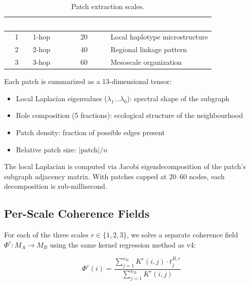 \documentclass{../yalumba}
\begin{document}
\begin{table}[H]
  \centering
  \tablestyle
  \caption{Patch extraction scales.}
  \label{tab:scales}
  \begin{tabular}{clcl}
    \toprule
    \rowcolor{table-header}
    \textcolor{white}{\textbf{Scale}} &
    \textcolor{white}{\textbf{Radius}} &
    \textcolor{white}{\textbf{Max nodes}} &
    \textcolor{white}{\textbf{Biological meaning}} \\
    \midrule
    1 & 1-hop & 20 & Local haplotype microstructure \\
    2 & 2-hop & 40 & Regional linkage pattern \\
    3 & 3-hop & 60 & Mesoscale organization \\
    \bottomrule
  \end{tabular}
\end{table}

Each patch is summarized as a 13-dimensional tensor:

\begin{itemize}
  \item Local Laplacian eigenvalues ($\lambda_1 \ldots \lambda_6$): spectral
    shape of the subgraph
  \item Role composition (5 fractions): ecological structure of the
    neighbourhood
  \item Patch density: fraction of possible edges present
  \item Relative patch size: $|$patch$|/n$
\end{itemize}


The local Laplacian is computed via Jacobi eigendecomposition of the patch's
subgraph adjacency matrix.  With patches capped at 20--60 nodes, each
decomposition is sub-millisecond.

\subsection{Per-Scale Coherence Fields}

For each of the three scales $r \in \{1, 2, 3\}$, we solve a separate
coherence field $\Phi^r: M_A \to M_B$ using the same kernel regression
method as v4:

\begin{equation}
  \Phi^r(i) = \frac{\sum_{j=1}^{n_B} K^r(i,j) \cdot t_j^{B,r}}
                    {\sum_{j=1}^{n_B} K^r(i,j)}
  \label{eq:field}
\end{equation}
\end{document}

